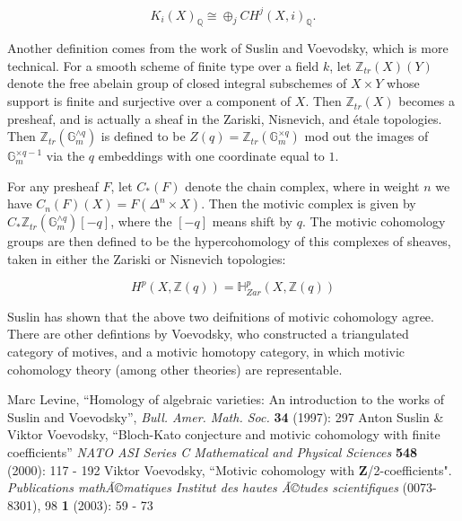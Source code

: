 \documentclass[12pt]{article}
\begin{document}
$$ K_i(X)_\mathbb{Q} \cong \oplus_j CH^j(X,i)_\mathbb{Q}.$$

Another definition comes from the work of Suslin and Voevodsky, which is more technical. For a smooth scheme of finite type over a field $k$, let $\mathbb{Z}_{tr}(X)(Y)$ denote the free abelain group of closed integral subschemes of $X \times Y$ whose support is finite and surjective over a component of $X$. Then $\mathbb{Z}_{tr}(X)$ becomes a presheaf, and is actually a sheaf in the Zariski, Nisnevich, and \'etale topologies. Then $\mathbb{Z}_{tr}(\mathbb{G}_m^{\wedge q})$ is defined to be $Z(q) = \mathbb{Z}_{tr}(\mathbb{G}_m^{\times q})$ mod out the images of $\mathbb{G}_m^{\times q-1}$ via the $q$ embeddings with one coordinate equal to $1$.

For any presheaf $F$, let $C_*(F)$ denote the chain complex, where in weight $n$ we have $C_n(F)(X) = F(\Delta^n \times X)$. Then the motivic complex is given by $C_*\mathbb{Z}_{tr}(\mathbb{G}_m^{\wedge q})[-q]$, where the $[-q]$ means shift by $q$. The motivic cohomology groups are then defined to be the hypercohomology of this complexes of sheaves, taken in either the Zariski or Nisnevich topologies:

$$ H^p(X,\mathbb{Z}(q)) = \mathbb{H}^p_{Zar}(X,\mathbb{Z}(q))$$

Suslin has shown that the above two deifnitions of motivic cohomology agree. There are other defintions by Voevodsky, who constructed a triangulated category of motives, and a motivic homotopy category, in which motivic cohomology theory (among other theories) are representable.

\begin{thebibliography}{3}
 Marc Levine, ``Homology of algebraic varieties: An introduction to the works of Suslin and Voevodsky'', {\it Bull. Amer. Math. Soc.} {\bf 34} (1997): 297
 Anton Suslin \& Viktor Voevodsky, ``Bloch-Kato conjecture and motivic cohomology with finite coefficients'' {\it NATO ASI Series C Mathematical and Physical Sciences} {\bf 548} (2000): 117 - 192
 Viktor Voevodsky, ``Motivic cohomology with {\bf Z}/2-coefficients". {\it Publications mathÃ©matiques Institut des hautes Ã©tudes scientifiques} (0073-8301), 98 {\bf 1} (2003): 59 - 73
\end{thebibliography}
\end{document}
